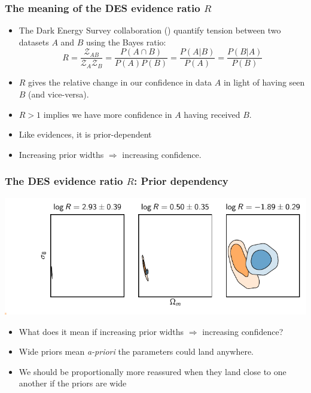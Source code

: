 \documentclass[%
]{beamer}
\begin{document}
\begin{frame}
    \frametitle{The meaning of the DES evidence ratio $R$}
    \begin{itemize}
        \item The Dark Energy Survey collaboration () quantify tension between two datasets $A$ and $B$ using the Bayes ratio:
            \[
                R = \frac{\mathcal{Z}_{AB}}{\mathcal{Z}_A \mathcal{Z}_B} = \frac{P(A\cap B)}{P(A)P(B)} = \frac{P(A|B)}{P(A)} = \frac{P(B|A)}{P(B)}
            \]
        \item $R$ gives the relative change in our confidence in data $A$ in light of having seen $B$ (and vice-versa).
        \item $R>1$ implies we have more confidence in $A$ having received $B$.
        \item Like evidences, it is prior-dependent
        \item Increasing prior widths $\Rightarrow$ increasing confidence.
    \end{itemize}
\end{frame}

\begin{frame}
    \frametitle{The DES evidence ratio $R$: Prior dependency}
    {\includegraphics[trim=0.6in 0.3in 0in 0in]{./plots/prior_dependency.pdf}}
    \begin{itemize}
        \item What does it mean if increasing prior widths $\Rightarrow$ increasing confidence? 
        \item Wide priors mean {\em a-priori\/} the parameters could land anywhere.
        \item We should be proportionally more reassured when they land close to one another if the priors are wide
    \end{itemize}
\end{frame}
\end{document}
